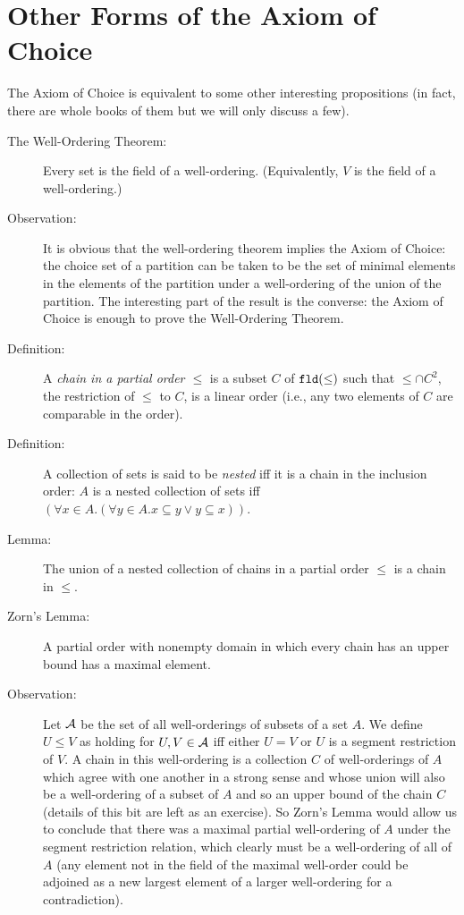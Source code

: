 \documentclass[12pt]{book}
\begin{document}
\newpage

\section{Other Forms of the Axiom of Choice}

The Axiom of Choice is equivalent to some other interesting
propositions (in fact, there are whole books of them but we will only
discuss a few).

\begin{description}

\item[The Well-Ordering Theorem:] Every set is the field of a
well-ordering.  (Equivalently, $V$ is the field of a well-ordering.)

\item[Observation:] It is obvious that the well-ordering theorem
implies the Axiom of Choice: the choice set of a partition can be
taken to be the set of minimal elements in the elements of the
partition under a well-ordering of the union of the partition.  The
interesting part of the result is the converse: the Axiom of Choice is
enough to prove the Well-Ordering Theorem.

\item[Definition:] A {\em chain in a partial order $\leq$\/} is a subset
$C$ of ${\tt fld}(\leq)$ such that $\leq\cap C^2$, the restriction of
$\leq$ to $C$, is a linear order (i.e., any two elements of $C$ are
comparable in the order).

\item[Definition:] A collection of sets is said to be
{\em nested\/} iff it is a chain in the inclusion order: $A$ is a nested
collection of sets iff $(\forall x \in A.(\forall y \in A.x\subseteq y
\vee y \subseteq x))$.

\item[Lemma:] The union of a nested collection of chains in a partial
order $\leq$ is a chain in $\leq$.

\item[Zorn's Lemma:] A partial order with nonempty domain in which
every chain has an upper bound has a maximal element.

\item[Observation:] Let $\cal A$ be the set of all well-orderings of
subsets of a set $A$.  We define $U \leq V$ as holding for $U,V \in
{\cal A}$ iff either $U=V$ or $U$ is a segment restriction of $V$.  A
chain in this well-ordering is a collection $C$ of well-orderings of
$A$ which agree with one another in a strong sense and whose union
will also be a well-ordering of a subset of $A$ and so an upper bound
of the chain $C$ (details of this bit are left as an exercise).  So
Zorn's Lemma would allow us to conclude that there was a maximal
partial well-ordering of $A$ under the segment restriction relation,
which clearly must be a well-ordering of all of $A$ (any element not
in the field of the maximal well-order could be adjoined as a new
largest element of a larger well-ordering for a contradiction).


\end{description}
\end{document}
